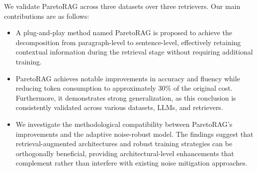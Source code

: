 We validate ParetoRAG across three datasets over three retrievers. 
Our main contributions are as follows:
\begin{itemize}
    \item A plug-and-play method named ParetoRAG is proposed to achieve the decomposition from paragraph-level to sentence-level, effectively retaining contextual information during the retrieval stage without requiring additional training.
    \item ParetoRAG achieves notable improvements in accuracy and fluency while reducing token consumption to approximately 30\% of the original cost. Furthermore, it demonstrates strong generalization, as this conclusion is consistently validated across various datasets, LLMs, and retrievers.
    \item We investigate the methodological compatibility between ParetoRAG's improvements and the adaptive noise-robust model. The findings suggest that retrieval-augmented architectures and robust training strategies can be orthogonally beneficial, providing architectural-level enhancements that complement rather than interfere with existing noise mitigation approaches.
\end{itemize}




